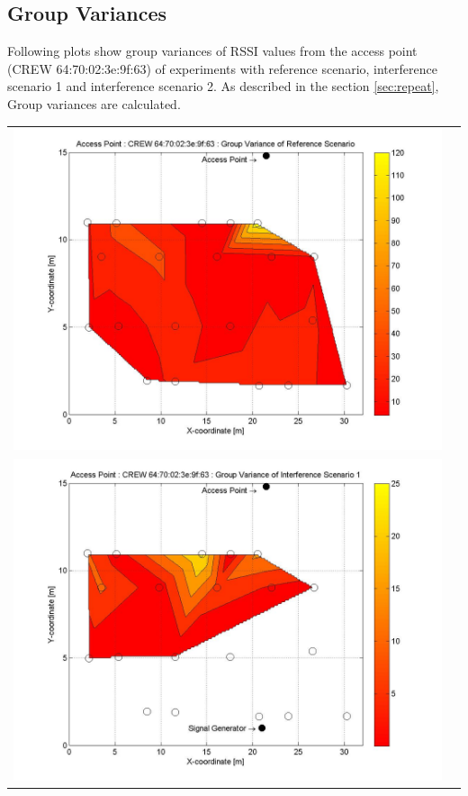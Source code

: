 \documentclass[11pt,a4paper,headinclude,footinclude,chapterprefix=on]{scrreprt}
\begin{document}
\subsection{Group Variances} 
Following plots show group variances of RSSI values from the access point (CREW 64:70:02:3e:9f:63) of experiments with reference scenario, interference scenario 1 and interference scenario 2. As described in the section \ref{sec:repeat}, Group variances are calculated.  
\begin{longtable}
	{lr} 
	\includegraphics[width=13cm]{../../Source/plot/CREW_63/63_Ref_Group_Variance.jpg} \\
	\includegraphics[width=13cm]{../../Source/plot/CREW_63/63_Sig_Group_Variance.jpg} \\

\end{longtable}
\end{document}
